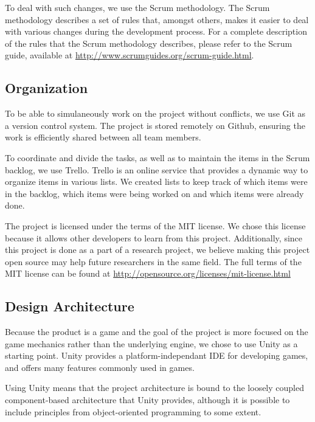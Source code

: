       To deal with such changes, we use the Scrum methodology. The Scrum
      methodology describes a set of rules that, amongst others, makes it
      easier to deal with various changes during the development process.
      For a complete description of the rules that the Scrum methodology
      describes, please refer to the Scrum guide, available at
      \url{http://www.scrumguides.org/scrum-guide.html}.

    \subsection{Organization} \label{ssec:organization}
      To be able to simulaneously work on the project without conflicts, we
      use Git as a version control system. The project is stored remotely on
      Github, ensuring the work is efficiently shared between all team members.

      To coordinate and divide the tasks, as well as to maintain the items in
      the Scrum backlog, we use Trello. Trello is an online service that
      provides a dynamic way to organize items in various lists. We created
      lists to keep track of which items were in the backlog, which items were
      being worked on and which items were already done.

      The project is licensed under the terms of the MIT license. We chose
      this license because it allows other developers to learn from this
      project. Additionally, since this project is done as a part of a
      research project, we believe making this project open source may
      help future researchers in the same field. The full terms of the MIT
      license can be found at \url{http://opensource.org/licenses/mit-license.html}

    \subsection{Design Architecture} \label{ssec:designarchitecture}
      Because the product is a game and the goal of the project is more
      focused on the game mechanics rather than the underlying engine, we chose
      to use Unity as a starting point. Unity provides a platform-independant
      IDE for developing games, and offers many features commonly used in
      games.

      Using Unity means that the project architecture is bound to the
      loosely coupled component-based architecture that Unity provides,
      although it is possible to include principles from object-oriented
      programming to some extent.
